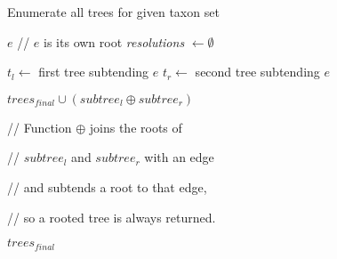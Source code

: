 \documentclass{article}
\begin{document}
\renewcommand{\algorithmiccomment}[1]{// #1}
\begin{algorithm}
\caption{Enumerate all trees for given taxon set}\label{euclid}
\begin{algorithmic}[1]


		\Return $e$	\quad \algorithmiccomment{$e$ is its own root}
	\EndIf
    \State \textit{resolutions} $\gets \emptyset$
    
	\State $t_l \gets$ first tree subtending $e$
	\State $t_r \gets$ second tree subtending $e$

	
			
			\State $trees_{final} \cup (subtree_l \oplus subtree_r)$ 
			
			\quad \quad \quad \quad \quad \algorithmiccomment {Function $\oplus$ joins the roots of } 
																
			\quad \quad \quad \quad \quad \algorithmiccomment {$subtree_l$ and $subtree_r$ with an edge}
																	 
			\quad \quad \quad \quad \quad \algorithmiccomment {and subtends a root to that edge,}

			\quad \quad \quad \quad \quad \algorithmiccomment {so a rooted tree is always returned.}
		\EndFor
	\EndFor
\EndFor

\Return $trees_{final}$
\EndProcedure
\end{algorithmic}
\end{algorithm}
\end{document}
